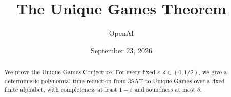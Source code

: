 \documentclass[11pt]{article}
\title{The Unique Games Theorem}
\author{OpenAI}
\date{September 23, 2026}
\theoremstyle{definition}
\theoremstyle{remark}
\numberwithin{equation}{section}
\begin{document}
\maketitle
\begin{abstract}
We prove the Unique Games Conjecture. For every fixed
\(\varepsilon,\delta\in(0,1/2)\), we give a deterministic polynomial-time
reduction from \(\mathrm{3SAT}\) to Unique Games over a fixed finite alphabet,
with completeness at least \(1-\varepsilon\) and soundness at most \(\delta\).
\end{abstract}

\begingroup
\small
\setlength{\baselineskip}{10.5pt}
\setlength{\cftbeforesecskip}{3pt}
\tableofcontents
\endgroup
\clearpage

\FloatBarrier







\appendix



\end{document}

